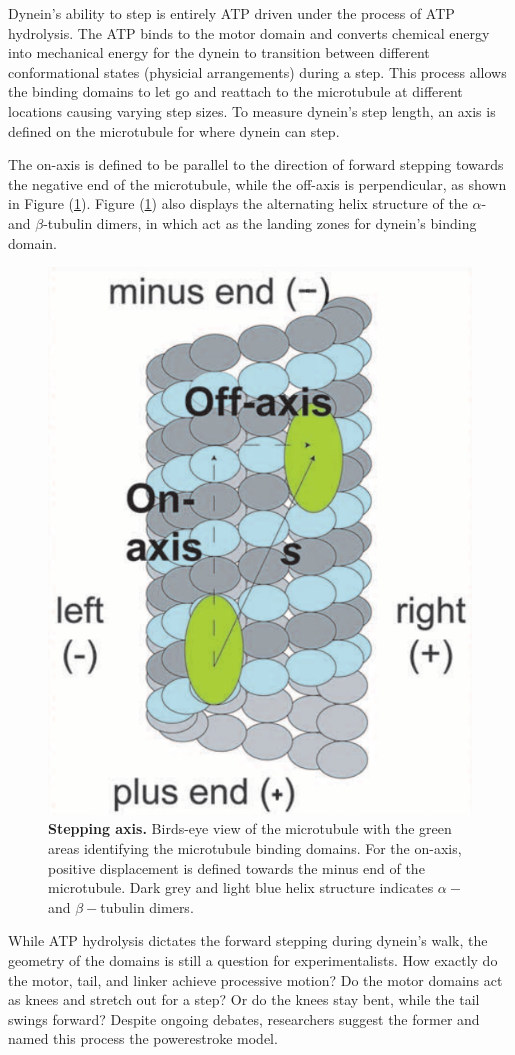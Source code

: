 Dynein's ability to step is entirely ATP driven under the process of ATP hydrolysis. The ATP binds to the motor domain and converts chemical energy into mechanical energy for the dynein to transition between different conformational states (physicial arrangements) during a step. This process allows the binding domains to let go and reattach to the microtubule at different locations causing varying step sizes. To measure dynein's step length, an axis is defined on the microtubule for where dynein can step.

The on-axis is defined to be parallel to the direction of forward stepping towards the negative end of the microtubule, while the off-axis is perpendicular, as shown in Figure (\ref{fig:axis}). Figure (\ref{fig:axis}) also displays the alternating helix structure of the $\alpha$- and $\beta$-tubulin dimers, in which act as the landing zones for dynein's binding domain.  

\begin{figure}[H]
	\centering
	\includegraphics[width=0.3\columnwidth]{Figures/Onaxis.png}
	\caption[Stepping Axis]{\textbf{Stepping axis.} Birds-eye view of the microtubule with the green areas identifying the microtubule binding domains. For the on-axis, positive displacement is defined towards the minus end of the microtubule. Dark grey and light blue helix structure indicates $\alpha-$ and $\beta-$tubulin dimers. \cite{Dewitt2012} }
	\label{fig:axis}
\end{figure}

While ATP hydrolysis dictates the forward stepping during dynein's walk, the geometry of the domains is still a question for experimentalists. How exactly do the motor, tail, and linker achieve processive motion? Do the motor domains act as knees and stretch out for a step? Or do the knees stay bent, while the tail swings forward? Despite ongoing debates, researchers suggest the former and named this process the powerestroke model. 



